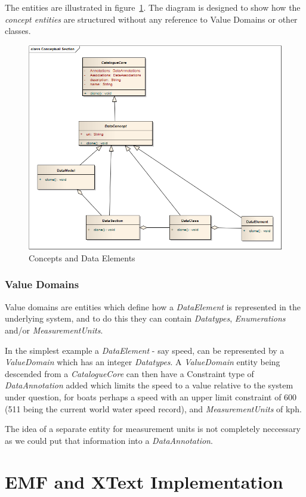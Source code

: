 \documentclass{article}
\begin{document}
The entities are illustrated in figure~\ref{fig:concepts}. The diagram is designed to show how the \emph{concept entities} are structured without any reference to Value Domains or other classes.

\begin{figure}[here]
	\includegraphics[scale=0.5]{diagrams/conceptsect}
	\caption{Concepts and Data Elements} 
	\label{fig:concepts}
\end{figure}

\subsubsection{Value Domains}

Value domains are entities which define how a \emph{DataElement} is represented in the underlying system, and to do this they can contain \emph{Datatypes}, \emph{Enumerations} and/or \emph{MeasurementUnits}. 

In the simplest example a \emph{DataElement} - say speed, can be represented by a \emph{ValueDomain} which has an integer \emph{Datatypes}. A  \emph{ValueDomain} entity being descended from a \emph{CatalogueCore} can then have a Constraint type of \emph{DataAnnotation} added which limits the speed to a value relative to the system under question, for boats perhaps a speed with an upper limit constraint of 600 (511 being the current world water speed record), and \emph{MeasurementUnits} of kph. 

The idea of a separate entity for measurement units is not completely neccessary as we could put that information into a \emph{DataAnnotation}.





\section{EMF and XText Implementation}


\newpage




\end{document}
